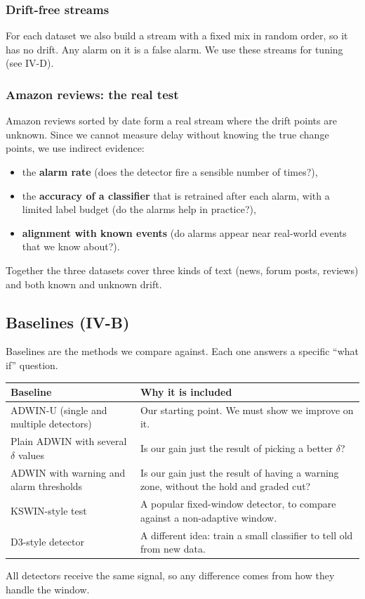 \documentclass[11pt,a4paper]{article}
\begin{document}
\subsubsection*{Drift-free streams}
For each dataset we also build a stream with a fixed mix in random order, so it has no drift. Any alarm on it is a false alarm. We use these streams for tuning (see IV-D).

\subsubsection*{Amazon reviews: the real test}
Amazon reviews sorted by date form a real stream where the drift points are unknown. Since we cannot measure delay without knowing the true change points, we use indirect evidence:
\begin{itemize}
\item the \textbf{alarm rate} (does the detector fire a sensible number of times?),
\item the \textbf{accuracy of a classifier} that is retrained after each alarm, with a limited label budget (do the alarms help in practice?),
\item \textbf{alignment with known events} (do alarms appear near real-world events that we know about?).
\end{itemize}
Together the three datasets cover three kinds of text (news, forum posts, reviews) and both known and unknown drift.

\subsection{Baselines (IV-B)}

Baselines are the methods we compare against. Each one answers a specific ``what if'' question.
\begin{center}
\small
\begin{tabular}{>{\raggedright\arraybackslash}p{4.2cm}>{\raggedright\arraybackslash}p{10.4cm}}
\toprule
Baseline & Why it is included \\
\midrule
ADWIN-U (single and multiple detectors) & Our starting point. We must show we improve on it. \\
Plain ADWIN with several $\delta$ values & Is our gain just the result of picking a better $\delta$? \\
ADWIN with warning and alarm thresholds & Is our gain just the result of having a warning zone, without the hold and graded cut? \\
KSWIN-style test & A popular fixed-window detector, to compare against a non-adaptive window. \\
D3-style detector & A different idea: train a small classifier to tell old from new data. \\
\bottomrule
\end{tabular}
\end{center}
All detectors receive the same signal, so any difference comes from how they handle the window.
\end{document}
